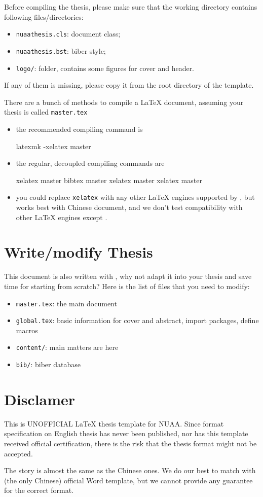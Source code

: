 Before compiling the thesis,
please make sure that the working directory contains following files/directories:
\begin{itemize}
  \item \verb|nuaathesis.cls|: document class;
  \item \verb|nuaathesis.bst|: biber style;
  \item \verb|logo/|: folder, contains some figures for cover and header.
\end{itemize}
If any of them is missing, please copy it from the root directory of the template.

There are a bunch of methods to compile a \LaTeX{} document,
assuming your thesis is called \verb|master.tex|
\begin{itemize}
\item the recommended compiling command is
\begin{shell}
latexmk -xelatex master
\end{shell}
\item the regular, decoupled compiling commands are
\begin{shell}
xelatex master
bibtex master
xelatex master
xelatex master
\end{shell}
\item you could replace \verb|xelatex| with any other \LaTeX{} engines supported by \CTeX,
but \XeLaTeX{} works best with Chinese document,
and we don't test compatibility with other \LaTeX{} engines except \XeLaTeX.
\end{itemize}

\section{Write/modify Thesis}

This document is also written with \nuaathesis,
why not adapt it into your thesis and save time for starting from scratch?
Here is the list of files that you need to modify:
\begin{itemize}
  \item \verb|master.tex|: the main document
  \item \verb|global.tex|: basic information for cover and abstract, import packages, define macros
  \item \verb|content/|: main matters are here
  \item \verb|bib/|: biber database
\end{itemize}

\section{Disclamer}

This is UNOFFICIAL \LaTeX{} thesis template for NUAA.
Since format specification on English thesis has never been published,
nor has this template received official certification,
there is the risk that the thesis format might not be accepted.

The story is almost the same as the Chinese ones.
We do our best to match \nuaathesis{} with (the only Chinese) official Word template,
but we cannot provide any guarantee for the correct format.

